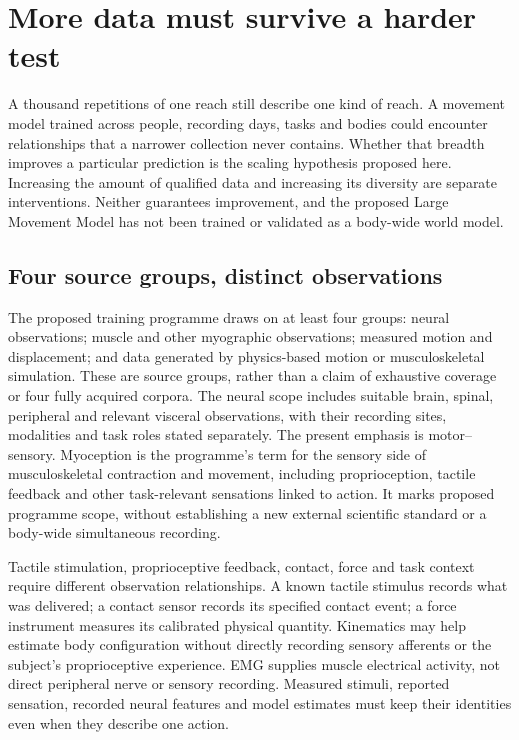 \section{More data must survive a harder test}

A thousand repetitions of one reach still describe one kind of reach. A movement model trained across people, recording days, tasks and bodies could encounter relationships that a narrower collection never contains. Whether that breadth improves a particular prediction is the scaling hypothesis proposed here. Increasing the amount of qualified data and increasing its diversity are separate interventions. Neither guarantees improvement, and the proposed Large Movement Model has not been trained or validated as a body-wide world model.

\subsection{Four source groups, distinct observations}

The proposed training programme draws on at least four groups: neural observations; muscle and other myographic observations; measured motion and displacement; and data generated by physics-based motion or musculoskeletal simulation. These are source groups, rather than a claim of exhaustive coverage or four fully acquired corpora. The neural scope includes suitable brain, spinal, peripheral and relevant visceral observations, with their recording sites, modalities and task roles stated separately. The present emphasis is motor--sensory. Myoception is the programme's term for the sensory side of musculoskeletal contraction and movement, including proprioception, tactile feedback and other task-relevant sensations linked to action. It marks proposed programme scope, without establishing a new external scientific standard or a body-wide simultaneous recording.

Tactile stimulation, proprioceptive feedback, contact, force and task context require different observation relationships. A known tactile stimulus records what was delivered; a contact sensor records its specified contact event; a force instrument measures its calibrated physical quantity. Kinematics may help estimate body configuration without directly recording sensory afferents or the subject's proprioceptive experience. EMG supplies muscle electrical activity, not direct peripheral nerve or sensory recording. Measured stimuli, reported sensation, recorded neural features and model estimates must keep their identities even when they describe one action.

